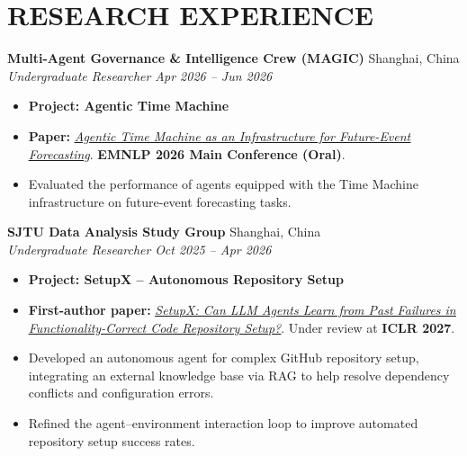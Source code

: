 \documentclass[a4paper,11pt]{article}
\newcommand{\paperlink}[2]{\href{#1}{\uline{#2}}}
\newcommand{\resheading}[1]{\section*{#1}}
\begin{document}
\resheading{RESEARCH EXPERIENCE}


\textbf{Multi-Agent Governance \& Intelligence Crew (MAGIC)}
\hfill Shanghai, China \\
\emph{Undergraduate Researcher}
\hfill \emph{Apr 2026 -- Jun 2026}

\begin{itemize}
    \item \textbf{Project: Agentic Time Machine}
    \item \textbf{Paper:}
    \paperlink{https://arxiv.org/abs/2606.21013}{%
        \emph{Agentic Time Machine as an Infrastructure
        for Future-Event Forecasting}}.
    \textbf{EMNLP 2026 Main Conference (Oral)}.
    \item Evaluated the performance of agents equipped with
    the Time Machine infrastructure on future-event
    forecasting tasks.
\end{itemize}



\vspace{3pt}

\begin{samepage}
\textbf{SJTU Data Analysis Study Group}
\hfill Shanghai, China \\
\emph{Undergraduate Researcher}
\hfill \emph{Oct 2025 -- Apr 2026}
\begin{itemize}
    \item \textbf{Project: SetupX -- Autonomous Repository Setup}
    \item \textbf{First-author paper:}
    \emph{\paperlink{https://arxiv.org/abs/2605.26186}{%
        SetupX: Can LLM Agents Learn from Past Failures
        in Functionality-Correct Code Repository Setup?}}.
    Under review at \textbf{ICLR 2027}.
    \item Developed an autonomous agent for complex GitHub
    repository setup, integrating an external knowledge base
    via RAG to help resolve dependency conflicts and
    configuration errors.
    \item Refined the agent--environment interaction loop
    to improve automated repository setup success rates.
\end{itemize}



\vspace{3pt}

\end{samepage}
\end{document}
